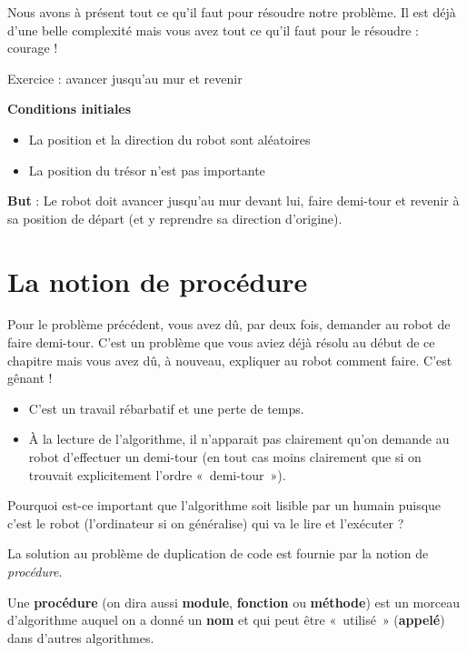 	Nous avons à présent tout ce qu'il faut pour résoudre
	notre problème. Il est déjà d'une belle complexité
	mais vous avez tout ce qu'il faut pour le résoudre :
	courage !

	\begin{Emphase}{Exercice : avancer jusqu'au mur et revenir}

		\textbf{Conditions initiales}

		\begin{itemize}
		\item La position et la direction du robot sont aléatoires
		\item La position du trésor n'est pas importante
		\end{itemize}
		
		\textbf{But} : Le robot doit avancer jusqu'au mur
		devant lui, faire demi-tour et revenir à sa position de départ 
		(et y reprendre sa direction d'origine).

	\end{Emphase}

\section{La notion de procédure}

	Pour le problème précédent, vous avez dû, par deux fois, demander au
	robot de faire demi-tour. C'est un problème que vous
	aviez déjà résolu au début de ce chapitre mais vous avez dû, à nouveau,
	expliquer au robot comment faire. C'est gênant !

	\begin{itemize}
	\item C'est un travail rébarbatif et une perte de temps.
	\item 
		À la lecture de l'algorithme, 
		il n'apparait pas clairement qu'on demande au robot 
		d'effectuer un demi-tour
		(en tout cas moins clairement que si on trouvait explicitement
		l'ordre «~demi-tour~»).
	\end{itemize}

	Pourquoi est-ce important que l'algorithme soit lisible
	par un humain puisque c'est le robot
	(l'ordinateur si on généralise) qui va le lire et
	l'exécuter ?

	La solution au problème de duplication de code est fournie par la notion
	de \textit{procédure}.

	Une \textbf{procédure} (on dira aussi \textbf{module}, \textbf{fonction}
	ou \textbf{méthode}) est un morceau d'algorithme
	auquel on a donné un \textbf{nom} et qui peut être «~utilisé~»
	(\textbf{appelé}) dans d'autres algorithmes.

